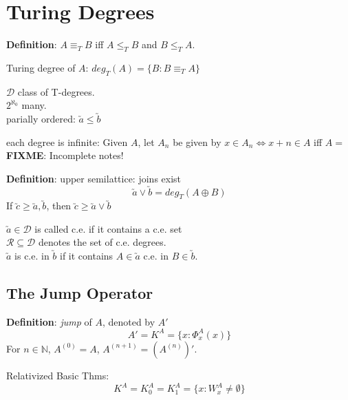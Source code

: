 \documentclass[12pt]{article}
\newcommand{\Nat}{\ensuremath{\mathbb{N}}}
\newcommand{\defn}{\textbf{Definition}: }
\newcommand{\fixme}{\\ \textbf{FIXME}: Incomplete notes!}
\begin{document}
\section*{Turing Degrees}

\defn $A \equiv_T B$ iff $A \le_T B$ and $B \le_T A$.

Turing degree of $A$:	$deg_T(A) = \{ B : B \equiv_T A \}$

$\mathcal{D}$ class of T-degrees.\\	$2^{\aleph_0}$ many. \\
parially ordered: $\utilde{a} \le \utilde{b}$ %

each degree is infinite: Given $A$, let $A_n$ 
be given by $ x \in A_n \Leftrightarrow x + n \in A$
iff $A = $ \fixme %

\newcommand{\join}{\vee}
\defn upper semilattice: joins exist
\[
 \utilde{a} \join \utilde{b} = deg_T(A \oplus B)
\]
If $\utilde{c} \ge \utilde{a}, \utilde{b}$, then 
$\utilde{c} \ge \utilde{a} \join \utilde{b}$

$\utilde{a} \in \mathcal{D}$ is called c.e. if it contains a c.e. set \\
$\mathcal{R} \subseteq \mathcal{D}$ denotes the set of c.e. degrees. \\
$\utilde{a}$ is c.e. in $\utilde{b}$ if it contains $A \in \utilde{a}$ c.e. in $B \in \utilde{b}$.

\subsection*{The Jump Operator}
\defn \emph{jump} of $A$, denoted by $A'$
\[
 A' = K^A = \{ x : \Phi^A_x(x) \}
\]
For $n \in \Nat$, $A^{(0)} = A$, $A^{(n+1)} = (A^{(n)})'$.

Relativized Basic Thms:
\[
 K^A = K^A_0 = K^A_1 = \{ x : W^A_x \ne \emptyset \}
\]
\end{document}

